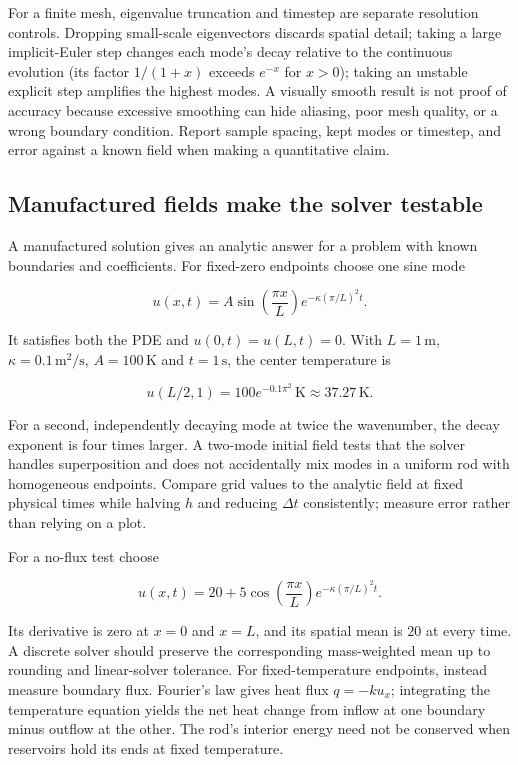 For a finite mesh, eigenvalue truncation and timestep are separate resolution controls. Dropping small-scale eigenvectors discards spatial detail; taking a large implicit-Euler step changes each mode's decay relative to the continuous evolution (its factor \(1/(1+x)\) exceeds \(e^{-x}\) for \(x>0\)); taking an unstable explicit step amplifies the highest modes. A visually smooth result is not proof of accuracy because excessive smoothing can hide aliasing, poor mesh quality, or a wrong boundary condition. Report sample spacing, kept modes or timestep, and error against a known field when making a quantitative claim.

\subsection{Manufactured fields make the solver testable}\label{04-visual-computing-ii-ch030-manufactured-fields-make-the-solver-testable}

\hypertarget{04-visual-computing-ii-ch030-manufactured-fields-make-the-solver-testable}{}

A manufactured solution gives an analytic answer for a problem with known boundaries and coefficients. For fixed-zero endpoints choose one sine mode

\[
u(x,t)=A\sin\left(\frac{\pi x}{L}\right)e^{-\kappa(\pi/L)^2t}.
\]

It satisfies both the PDE and \(u(0,t)=u(L,t)=0\). With \(L=1\,\mathrm m\), \(\kappa=0.1\,\mathrm{m^2/s}\), \(A=100\,\mathrm K\) and \(t=1\,\mathrm s\), the center temperature is

\[
u(L/2,1)=100e^{-0.1\pi^2}\,\mathrm K\approx37.27\,\mathrm K.
\]

For a second, independently decaying mode at twice the wavenumber, the decay exponent is four times larger. A two-mode initial field tests that the solver handles superposition and does not accidentally mix modes in a uniform rod with homogeneous endpoints. Compare grid values to the analytic field at fixed physical times while halving \(h\) and reducing \(\Delta t\) consistently; measure error rather than relying on a plot.

For a no-flux test choose

\[
u(x,t)=20+5\cos\left(\frac{\pi x}{L}\right)e^{-\kappa(\pi/L)^2t}.
\]

Its derivative is zero at \(x=0\) and \(x=L\), and its spatial mean is \(20\) at every time. A discrete solver should preserve the corresponding mass-weighted mean up to rounding and linear-solver tolerance. For fixed-temperature endpoints, instead measure boundary flux. Fourier's law gives heat flux \(q=-k u_x\); integrating the temperature equation yields the net heat change from inflow at one boundary minus outflow at the other. The rod's interior energy need not be conserved when reservoirs hold its ends at fixed temperature.

